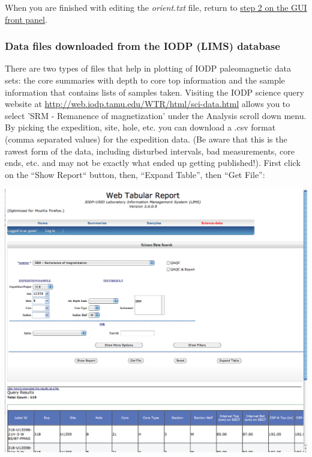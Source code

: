 \documentclass[11pt]{book}
\begin{document}
{When you are finished with editing the {\it orient.txt} file,  return to  \href{#orient}{step 2 on the GUI front panel}.


%
%
%
%


\subsubsection{Data files downloaded from the IODP (LIMS) database}


There are two types of files that help in plotting of IODP paleomagnetic data sets: the core summaries with depth to core top information and the sample information that contains lists of samples taken.
Visiting the IODP science query website at \url{http://web.iodp.tamu.edu/WTR/html/sci-data.html} allows you to
select 'SRM - Remanence of magnetization' under the Analysis scroll down menu.  By picking the expedition, site, hole, etc. you can download a  .csv format (comma separated values) for the expedition data.  (Be aware that this is the rawest form of the data, including disturbed intervals, bad measurements, core ends, etc. and may not be exactly what ended up getting published!).   First click on the ``Show Report`` button, then, ``Expand Table'', then ``Get File'':

\includegraphics[width=15cm]{EPSfiles/WebTabular_srm.eps}

}
\end{document}
